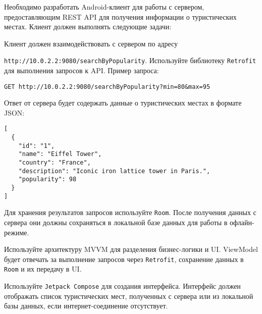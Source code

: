 
Необходимо разработать Android-клиент для работы с сервером, предоставляющим REST API для получения информации о туристических местах. Клиент должен выполнять следующие задачи:

Клиент должен взаимодействовать с сервером по адресу 

\texttt{http://10.0.2.2:9080/searchByPopularity}. Используйте библиотеку \texttt{Retrofit} для выполнения запросов к API. Пример запроса:

\begin{verbatim}
GET http://10.0.2.2:9080/searchByPopularity?min=80&max=95
\end{verbatim}

Ответ от сервера будет содержать данные о туристических местах в формате JSON:

\begin{verbatim}
[
  {
    "id": "1",
    "name": "Eiffel Tower",
    "country": "France",
    "description": "Iconic iron lattice tower in Paris.",
    "popularity": 98
  }
]
\end{verbatim}

Для хранения результатов запросов используйте \texttt{Room}. После получения данных с сервера они должны сохраняться в локальной базе данных для работы в офлайн-режиме.

Используйте архитектуру MVVM для разделения бизнес-логики и UI. ViewModel будет отвечать за выполнение запросов через \texttt{Retrofit}, сохранение данных в \texttt{Room} и их передачу в UI.

Используйте \texttt{Jetpack Compose} для создания интерфейса. Интерфейс должен отображать список туристических мест, полученных с сервера или из локальной базы данных, если интернет-соединение отсутствует.


